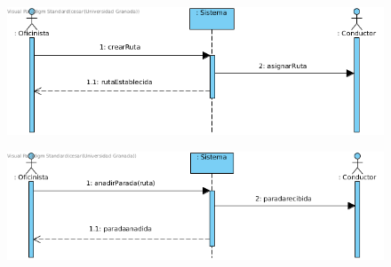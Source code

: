 \begin{figure}[H]
	\centering
	\includegraphics[width=16cm]{29}
\end{figure}
\begin{figure}[H]
	\centering
	\includegraphics[width=16cm]{30}
\end{figure}
\newpage
